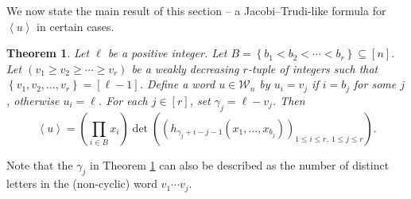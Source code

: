 \documentclass[reqno]{amsart}
\newcommand{\0}{\phantom{c}}
\let\prodnonlimits\prod
\renewcommand{\prod}{\prodnonlimits\limits}
\theoremstyle{plain}
\newtheorem{thm}{Theorem}[section]
\theoremstyle{definition}
\numberwithin{equation}{section}
\begin{document}
We now state the main result of this section -- a Jacobi--Trudi-like formula
for $\left\langle u\right\rangle $ in certain cases.

\begin{thm}
\label{thm:determinant_form} Let $\ell$ be a positive integer. Let $B=\left\{
b_{1}<b_{2}<\cdots<b_{r}\right\}  \subseteq\left[  n\right]  $. Let $\left(
v_{1}\geq v_{2}\geq\dotsm\geq v_{r}\right)  $ be a weakly decreasing $r$-tuple
of integers such that $\left\{  v_{1},v_{2},\ldots,v_{r}\right\}  =\left[
\ell-1\right]  $. Define a word $u\in\mathcal{W}_{n}$ by $u_{i}=v_{j}$ if
$i=b_{j}$ for some $j$, otherwise $u_{i}=\ell$. For each $j\in\left[
r\right]  $, set $\gamma_{j}=\ell-v_{j}$. Then
\[
\left\langle u\right\rangle =\left(  \prod_{i\in B}x_{i}\right)  \det\left(
\left(  h_{\gamma_{j}+i-j-1}(x_{1},\dotsc,x_{b_{j}})\right)  _{1\leq i\leq
r,\ 1\leq j\leq r}\right)  .
\]

\end{thm}

Note that the $\gamma_{j}$ in Theorem \ref{thm:determinant_form} can also be
described as the number of distinct letters in the (non-cyclic) word
$v_{1}\dotsm v_{j}$.
\end{document}
